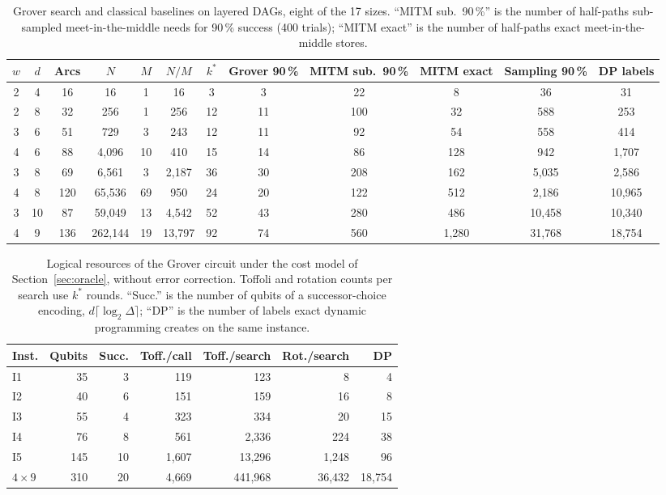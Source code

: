 \documentclass[journal]{IEEEtran}
\begin{document}
\begin{table}[t]
\caption{Grover search and classical baselines on layered DAGs, eight of the 17 sizes. ``MITM sub.\ 90\,\%'' is the number of half-paths sub-sampled meet-in-the-middle needs for 90\,\% success (400 trials); ``MITM exact'' is the number of half-paths exact meet-in-the-middle stores.}
\label{tab:layered}
\centering
\footnotesize
\setlength{\tabcolsep}{3.5pt}
\begin{tabular}{cccccccccccc}
\hline \hline
\textbf{$w$} & \textbf{$d$} & \textbf{Arcs} & \textbf{$N$} & \textbf{$M$} & \textbf{$N/M$} & \textbf{$k^{*}$} & \textbf{Grover 90\,\%} & \textbf{MITM sub.\ 90\,\%} & \textbf{MITM exact} & \textbf{Sampling 90\,\%} & \textbf{DP labels} \\
\hline
2 & 4 & 16 & 16 & 1 & 16 & 3 & 3 & 22 & 8 & 36 & 31 \\
2 & 8 & 32 & 256 & 1 & 256 & 12 & 11 & 100 & 32 & 588 & 253 \\
3 & 6 & 51 & 729 & 3 & 243 & 12 & 11 & 92 & 54 & 558 & 414 \\
4 & 6 & 88 & 4{,}096 & 10 & 410 & 15 & 14 & 86 & 128 & 942 & 1{,}707 \\
3 & 8 & 69 & 6{,}561 & 3 & 2{,}187 & 36 & 30 & 208 & 162 & 5{,}035 & 2{,}586 \\
4 & 8 & 120 & 65{,}536 & 69 & 950 & 24 & 20 & 122 & 512 & 2{,}186 & 10{,}965 \\
3 & 10 & 87 & 59{,}049 & 13 & 4{,}542 & 52 & 43 & 280 & 486 & 10{,}458 & 10{,}340 \\
4 & 9 & 136 & 262{,}144 & 19 & 13{,}797 & 92 & 74 & 560 & 1{,}280 & 31{,}768 & 18{,}754 \\
\hline \hline
\end{tabular}
\end{table}

\begin{table}[t]
\caption{Logical resources of the Grover circuit under the cost model of Section~\ref{sec:oracle}, without error correction. Toffoli and rotation counts per search use $k^{*}$ rounds. ``Succ.'' is the number of qubits of a successor-choice encoding, $d\lceil\log_{2}\Delta\rceil$; ``DP'' is the number of labels exact dynamic programming creates on the same instance.}
\label{tab:resources}
\centering
\footnotesize
\setlength{\tabcolsep}{2.2pt}
\begin{tabular}{lrrrrrr}
\hline \hline
\textbf{Inst.} & \textbf{Qubits} & \textbf{Succ.} & \textbf{Toff./call} & \textbf{Toff./search} & \textbf{Rot./search} & \textbf{DP} \\
\hline
I1 & 35 & 3 & 119 & 123 & 8 & 4 \\
I2 & 40 & 6 & 151 & 159 & 16 & 8 \\
I3 & 55 & 4 & 323 & 334 & 20 & 15 \\
I4 & 76 & 8 & 561 & 2{,}336 & 224 & 38 \\
I5 & 145 & 10 & 1{,}607 & 13{,}296 & 1{,}248 & 96 \\
$4\times9$ & 310 & 20 & 4{,}669 & 441{,}968 & 36{,}432 & 18{,}754 \\
\hline \hline
\end{tabular}
\end{table}
\end{document}
